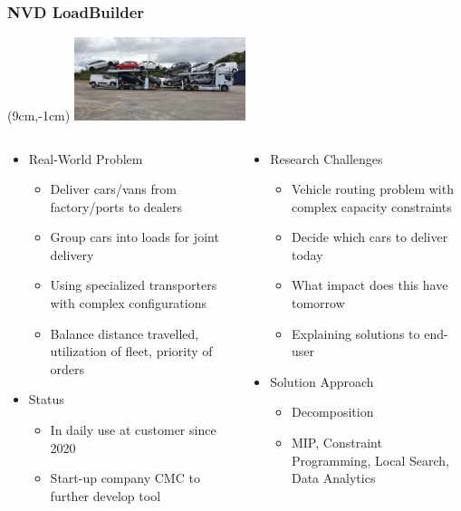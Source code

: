 \begin{frame}
\frametitle{NVD LoadBuilder}
\begin{textblock*}{5cm}(9cm,-1cm)
\includegraphics[width=5cm,angle=180]{images/metagointago}
\end{textblock*}

\begin{columns}[b]
\begin{column}{0.5\textwidth}
\begin{itemize}
\item Real-World Problem
\begin{itemize}
\item Deliver cars/vans from factory/ports to dealers
\item Group cars into loads for joint delivery
\item Using specialized transporters with complex configurations
\item Balance distance travelled, utilization of fleet, priority of orders
\end{itemize}
\item Status
\begin{itemize}
\item In daily use at customer since 2020
\item Start-up company CMC to further develop tool
\end{itemize}
\end{itemize}
\end{column}
\begin{column}{0.5\textwidth}
\begin{itemize}
\item Research Challenges
\begin{itemize}
\item Vehicle routing problem with complex capacity constraints
\item Decide which cars to deliver today
\item What impact does this have tomorrow
\item Explaining solutions to end-user
\end{itemize}
\item Solution Approach
\begin{itemize}
\item Decomposition
\item MIP, Constraint Programming, Local Search, Data Analytics
\end{itemize}
\end{itemize}
\end{column}
\end{columns}
\end{frame}

